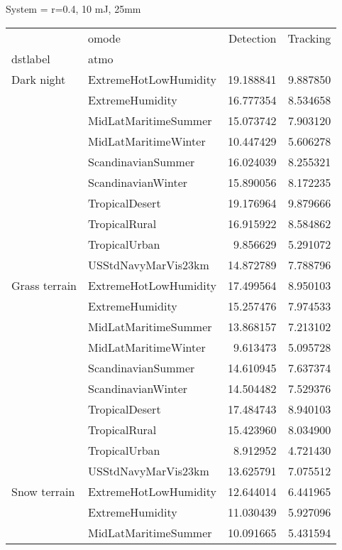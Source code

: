 \clearpage
System =  r=0.4, 10 mJ, 25mm

\begin{tabular}{llrr}
\toprule
             & omode &  Detection &  Tracking \\
dstlabel & atmo &            &           \\
\midrule
Dark night & ExtremeHotLowHumidity &  19.188841 &  9.887850 \\
             & ExtremeHumidity &  16.777354 &  8.534658 \\
             & MidLatMaritimeSummer &  15.073742 &  7.903120 \\
             & MidLatMaritimeWinter &  10.447429 &  5.606278 \\
             & ScandinavianSummer &  16.024039 &  8.255321 \\
             & ScandinavianWinter &  15.890056 &  8.172235 \\
             & TropicalDesert &  19.176964 &  9.879666 \\
             & TropicalRural &  16.915922 &  8.584862 \\
             & TropicalUrban &   9.856629 &  5.291072 \\
             & USStdNavyMarVis23km &  14.872789 &  7.788796 \\
Grass terrain & ExtremeHotLowHumidity &  17.499564 &  8.950103 \\
             & ExtremeHumidity &  15.257476 &  7.974533 \\
             & MidLatMaritimeSummer &  13.868157 &  7.213102 \\
             & MidLatMaritimeWinter &   9.613473 &  5.095728 \\
             & ScandinavianSummer &  14.610945 &  7.637374 \\
             & ScandinavianWinter &  14.504482 &  7.529376 \\
             & TropicalDesert &  17.484743 &  8.940103 \\
             & TropicalRural &  15.423960 &  8.034900 \\
             & TropicalUrban &   8.912952 &  4.721430 \\
             & USStdNavyMarVis23km &  13.625791 &  7.075512 \\
Snow terrain & ExtremeHotLowHumidity &  12.644014 &  6.441965 \\
             & ExtremeHumidity &  11.030439 &  5.927096 \\
             & MidLatMaritimeSummer &  10.091665 &  5.431594 \\

\end{tabular}
